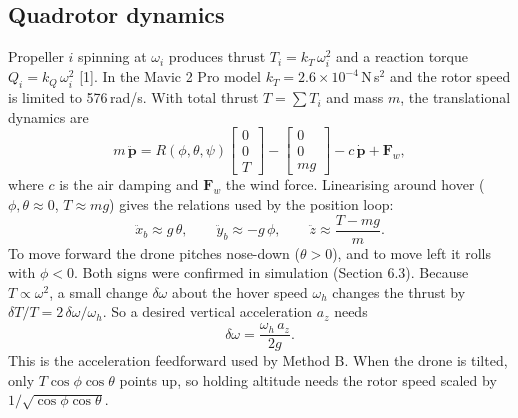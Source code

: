 \subsection{Quadrotor dynamics}
Propeller $i$ spinning at $\omega_i$ produces thrust $T_i = k_T\,\omega_i^2$ and a reaction torque $Q_i = k_Q\,\omega_i^2$ [1]. In the Mavic 2 Pro model $k_T = 2.6\times10^{-4}$\,N\,s$^2$ and the rotor speed is limited to 576\,rad/s. With total thrust $T=\sum T_i$ and mass $m$, the translational dynamics are
\begin{equation}
m\,\ddot{\mathbf{p}} = R(\phi,\theta,\psi)\begin{bmatrix}0\\0\\T\end{bmatrix} - \begin{bmatrix}0\\0\\mg\end{bmatrix} - c\,\dot{\mathbf{p}} + \mathbf{F}_{w},
\label{eq:trans}
\end{equation}
where $c$ is the air damping and $\mathbf{F}_w$ the wind force. Linearising around hover ($\phi,\theta \approx 0$, $T \approx mg$) gives the relations used by the position loop:
\begin{equation}
\ddot{x}_b \approx g\,\theta, \qquad \ddot{y}_b \approx -g\,\phi, \qquad \ddot z \approx \frac{T - mg}{m}.
\label{eq:lin}
\end{equation}
To move forward the drone pitches nose-down ($\theta>0$), and to move left it rolls with $\phi<0$. Both signs were confirmed in simulation (Section 6.3). Because $T \propto \omega^2$, a small change $\delta\omega$ about the hover speed $\omega_h$ changes the thrust by $\delta T/T = 2\,\delta\omega/\omega_h$. So a desired vertical acceleration $a_z$ needs
\begin{equation}
\delta\omega = \frac{\omega_h\,a_z}{2g}.
\label{eq:ff}
\end{equation}
This is the acceleration feedforward used by Method B. When the drone is tilted, only $T\cos\phi\cos\theta$ points up, so holding altitude needs the rotor speed scaled by $1/\sqrt{\cos\phi\cos\theta}$.

